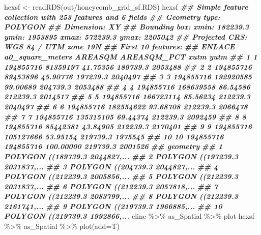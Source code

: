 \documentclass[10pt,landscape,a3paper]{article}
\newenvironment{Shaded}{\begin{snugshade}}{\end{snugshade}}
\newcommand{\AttributeTok}[1]{\textcolor[rgb]{0.77,0.63,0.00}{#1}}
\newcommand{\DocumentationTok}[1]{\textcolor[rgb]{0.56,0.35,0.01}{\textbf{\textit{#1}}}}
\newcommand{\FunctionTok}[1]{\textcolor[rgb]{0.00,0.00,0.00}{#1}}
\newcommand{\NormalTok}[1]{#1}
\newcommand{\OtherTok}[1]{\textcolor[rgb]{0.56,0.35,0.01}{#1}}
\newcommand{\SpecialCharTok}[1]{\textcolor[rgb]{0.00,0.00,0.00}{#1}}
\newcommand{\StringTok}[1]{\textcolor[rgb]{0.31,0.60,0.02}{#1}}
\begin{document}
\begin{Shaded}
\begin{Highlighting}[]
\NormalTok{hexsf }\OtherTok{\textless{}{-}} \FunctionTok{readRDS}\NormalTok{(}\StringTok{\textquotesingle{}out/honeycomb\_grid\_sf.RDS\textquotesingle{}}\NormalTok{)}
\NormalTok{hexsf}
\DocumentationTok{\#\# Simple feature collection with 253 features and 6 fields}
\DocumentationTok{\#\# Geometry type: POLYGON}
\DocumentationTok{\#\# Dimension:     XY}
\DocumentationTok{\#\# Bounding box:  xmin: 182239.3 ymin: 1953895 xmax: 572239.3 ymax: 2205042}
\DocumentationTok{\#\# Projected CRS: WGS 84 / UTM zone 19N}
\DocumentationTok{\#\# First 10 features:}
\DocumentationTok{\#\#    ENLACE a0\_square\_meters   AREASQM AREASQM\_PCT     xutm    yutm}
\DocumentationTok{\#\# 1       1        194855716  81359197    41.75356 189739.3 2053488}
\DocumentationTok{\#\# 2       2        194855716  89453896    45.90776 197239.3 2040497}
\DocumentationTok{\#\# 3       3        194855716 192920585    99.00689 204739.3 2053488}
\DocumentationTok{\#\# 4       4        194855716 168639558    86.54586 212239.3 2014517}
\DocumentationTok{\#\# 5       5        194855716 166723114    85.56234 212239.3 2040497}
\DocumentationTok{\#\# 6       6        194855716 182554622    93.68708 212239.3 2066478}
\DocumentationTok{\#\# 7       7        194855716 135315105    69.44374 212239.3 2092459}
\DocumentationTok{\#\# 8       8        194855716  85442381    43.84905 212239.3 2170401}
\DocumentationTok{\#\# 9       9        194855716 105127666    53.95154 219739.3 1975545}
\DocumentationTok{\#\# 10     10        194855716 194855716   100.00000 219739.3 2001526}
\DocumentationTok{\#\#                          geometry}
\DocumentationTok{\#\# 1  POLYGON ((189739.3 2044827,...}
\DocumentationTok{\#\# 2  POLYGON ((197239.3 2031837,...}
\DocumentationTok{\#\# 3  POLYGON ((204739.3 2044827,...}
\DocumentationTok{\#\# 4  POLYGON ((212239.3 2005856,...}
\DocumentationTok{\#\# 5  POLYGON ((212239.3 2031837,...}
\DocumentationTok{\#\# 6  POLYGON ((212239.3 2057818,...}
\DocumentationTok{\#\# 7  POLYGON ((212239.3 2083799,...}
\DocumentationTok{\#\# 8  POLYGON ((212239.3 2161741,...}
\DocumentationTok{\#\# 9  POLYGON ((219739.3 1966885,...}
\DocumentationTok{\#\# 10 POLYGON ((219739.3 1992866,...}
\NormalTok{cline }\SpecialCharTok{\%\textgreater{}\%}\NormalTok{ as\_Spatial }\SpecialCharTok{\%\textgreater{}\%}\NormalTok{ plot}
\NormalTok{hexsf }\SpecialCharTok{\%\textgreater{}\%}\NormalTok{ as\_Spatial }\SpecialCharTok{\%\textgreater{}\%} \FunctionTok{plot}\NormalTok{(}\AttributeTok{add=}\NormalTok{T)}
\end{Highlighting}
\end{Shaded}
\end{document}
